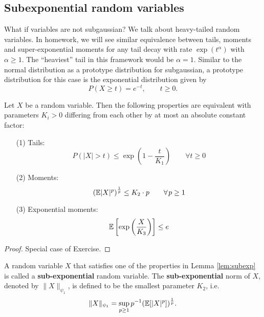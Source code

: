 \subsection{Subexponential random variables}
What if variables are not subgaussian? We talk about heavy-tailed random variables. In homework, we will see similar equivalence between tails, moments and super-exponential moments for any tail decay with rate $\exp(t^\alpha)$ with $\alpha \geq 1$. The ``heaviest'' tail in this framework would be $\alpha =1 $. Similar to the normal distribution as a prototype distribution for subgaussian, a prototype distribution for this case is the exponential distribution given by
\begin{equation*}
P(X\geq t) = e^{-t},\quad \quad t \geq 0.
\end{equation*}
\begin{lemma}\label{lem:subexp}
\begin{mdframed}
Let $X$ be a random variable. Then the following properties are equivalent with parameters $K_i>0$ differing from each other by at most an absolute constant factor: \vspace{-0.5pc}
\begin{enumerate}
\item[(1)] Tails:
\begin{equation*}
P(|X|>t) \leq \exp \left(1-\frac{t}{K_1}	\right)	\quad\quad \forall t\geq 0
\end{equation*}
\item[(2)] Moments:
\begin{equation*}
\left(
\E|X|^p
\right)^\frac{1}{p} \leq K_2 \cdot p \quad \quad \forall p \geq 1
\end{equation*}
\item[(3)] Exponential moments:
\begin{equation*}
\mathbb{E}\left[\exp\left(
\frac{X}{K_3}
\right)\right] \leq e
\end{equation*}
\end{enumerate}
\end{mdframed}
\begin{proof}
Special case of Exercise.
\end{proof}
\end{lemma}
\begin{definition}
\begin{mdframed}
A random variable $X$ that satisfies one of the properties in Lemma \ref{lem:subexp} is called a \textbf{sub-exponential} random variable. The \textbf{sub-exponential} norm of $X$, denoted by $\|X\|_{\psi_1}$, is defined to be the smallest parameter $K_2$, i.e.
\begin{equation*}
\|X\|_{\psi_1} = \sup_{p\geq 1} p^{-1} (\mathbb{E}[|X|^p])^{\frac{1}{p}}.
\end{equation*}
\end{mdframed}
\end{definition}
